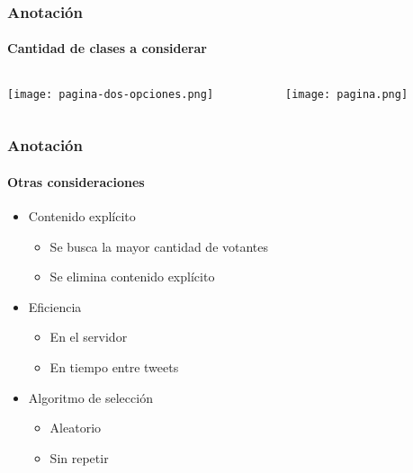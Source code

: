 \begin{frame}
\frametitle{Anotación}
\framesubtitle{Cantidad de clases a considerar}
        \begin{center}
        \begin{columns}[c]
            \begin{column}[c]{0.50\textwidth}
                \centering
                \texttt{[image: pagina-dos-opciones.png]}
            \end{column}

            \begin{column}[c]{0.50\textwidth}
                \centering
                \texttt{[image: pagina.png]}
            \end{column}
        \end{columns}
    \end{center}
\end{frame}
\begin{frame}
    \frametitle{Anotación}
    \framesubtitle{Otras consideraciones}

    \begin{itemize}
        \item Contenido explícito

        \begin{itemize}
            \item Se busca la mayor cantidad de votantes
            \item Se elimina contenido explícito
        \end{itemize}

        \item Eficiencia

        \begin{itemize}
            \item En el servidor
            \item En tiempo entre tweets
        \end{itemize}

        \item Algoritmo de selección

        \begin{itemize}
            \item Aleatorio
            \item Sin repetir
        \end{itemize}
    \end{itemize}
\end{frame}
